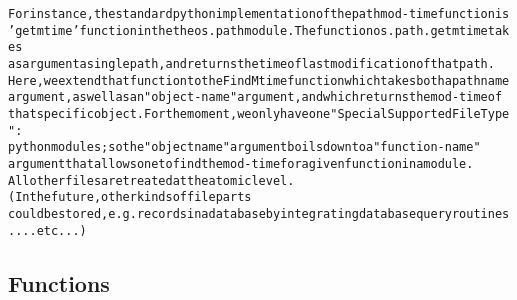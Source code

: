 \begin{alltt}
For instance, the standard python implementation of the path mod-time function is 
'getmtime' function in the the os.path module.  The function os.path.getmtime takes
as argument a single path, and returns the time of last modification of that path.   
Here, we extend that function to the FindMtime function which takes both a pathname 
argument, as well as an "object-name" argument, and which returns the mod-time of 
that specific object.  For the moment, we only have one "Special Supported File Type":  
python modules ; so the "objectname" argument boils down to a "function-name" 
argument that allows one to find the mod-time for a given function in a module.   
All other files are treated at the atomic level.  (In the future, other kinds of file parts
could be stored, e.g. records in a database by integrating database query routines .... etc...)
        
\end{alltt}



  \subsection{Functions}

    \label{System:Storage:FindMtime}

    \vspace{0.5ex}

